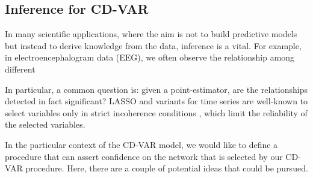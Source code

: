 \subsection{Inference for CD-VAR}

In many scientific applications, where the aim is not to build predictive models but instead to derive knowledge from the data, inference is a vital. For example, in electroencephalogram data (EEG), we often observe the relationship among different  

In particular, a common question is: given a point-estimator, are the relationships detected in fact significant? LASSO and variants for time series are well-known to select variables only in strict incoherence conditions , which limit the reliability of the selected variables. 
	
In the particular context of the CD-VAR model, we would like to define a procedure that can assert confidence on the network that is selected by our CD-VAR procedure. Here, there are a couple of potential ideas that could be pursued. 
	




